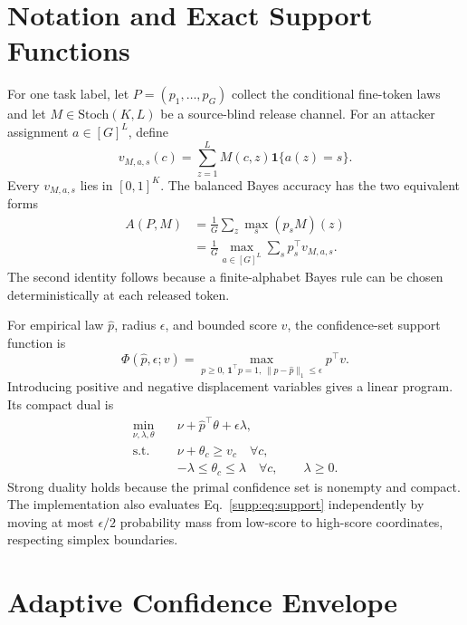 \section{Notation and Exact Support Functions}

For one task label, let $P=(p_1,\ldots,p_G)$ collect the conditional fine-token
laws and let $M\in\mathrm{Stoch}(K,L)$ be a source-blind release channel. For an
attacker assignment $a\in[G]^L$, define
\begin{equation}
 v_{M,a,s}(c)=\sum_{z=1}^{L}M(c,z)\mathbf 1\{a(z)=s\}.
 \label{supp:eq:v}
\end{equation}
Every $v_{M,a,s}$ lies in $[0,1]^K$. The balanced Bayes accuracy has the two
equivalent forms
\begin{equation}
 \begin{aligned}
 A(P,M)&=\frac{1}{G}\sum_z\max_s(p_sM)(z)\\
 &=\frac{1}{G}\max_{a\in[G]^L}\sum_sp_s^\top v_{M,a,s}.
 \end{aligned}
 \label{supp:eq:bayes}
\end{equation}
The second identity follows because a finite-alphabet Bayes rule can be chosen
deterministically at each released token.

For empirical law $\widehat p$, radius $\epsilon$, and bounded score $v$, the
confidence-set support function is
\begin{equation}
 \Phi(\widehat p,\epsilon;v)=
 \max_{p\geq0,\,\mathbf 1^\top p=1,\,
 \|p-\widehat p\|_1\leq\epsilon}p^\top v.
 \label{supp:eq:support}
\end{equation}
Introducing positive and negative displacement variables gives a linear
program. Its compact dual is
\begin{align}
 \min_{\nu,\lambda,\theta}\quad
 &\nu+\widehat p^\top\theta+\epsilon\lambda,\\
 \text{s.t.}\quad
 &\nu+\theta_c\geq v_c\quad\forall c,\\
 &-\lambda\leq\theta_c\leq\lambda\quad\forall c,
 \qquad \lambda\geq0.
 \label{supp:eq:supportdual}
\end{align}
Strong duality holds because the primal confidence set is nonempty and compact.
The implementation also evaluates Eq.~\eqref{supp:eq:support} independently by
moving at most $\epsilon/2$ probability mass from low-score to high-score
coordinates, respecting simplex boundaries.

\section{Adaptive Confidence Envelope}

